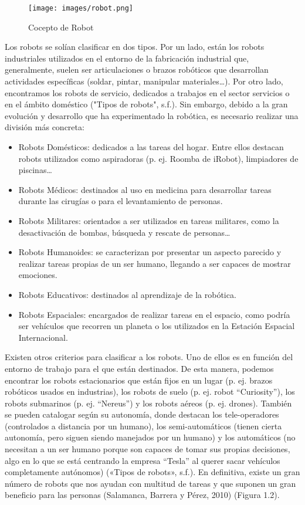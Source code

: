 \documentclass{report}
\begin{document}
\begin{figure}
  \centering
    \texttt{[image: images/robot.png]}
  \caption{Cocepto de Robot}
  \label{Cocepto de Robot}
\end{figure}

Los robots se solían clasificar en dos tipos. Por un lado, están los robots industriales utilizados en el entorno de la fabricación industrial que, generalmente, suelen ser articulaciones o brazos robóticos que desarrollan actividades específicas (soldar, pintar, manipular materiales…). Por otro lado, encontramos los robots de servicio, dedicados a trabajos en el sector servicios o en el ámbito doméstico ("Tipos de robots", s.f.). Sin embargo, debido a la gran evolución y desarrollo que ha experimentado la robótica, es necesario realizar una división más concreta:
\begin{itemize}
	\item Robots Domésticos: dedicados a las tareas del hogar. Entre ellos destacan robots utilizados como aspiradoras (p. ej. Roomba de iRobot), limpiadores de piscinas…

	\item Robots Médicos: destinados al uso en medicina para desarrollar tareas durante las cirugías o para el levantamiento de personas.
		
	\item Robots Militares: orientados a ser utilizados en tareas militares, como la desactivación de bombas, búsqueda y rescate de personas…
	
	\item Robots Humanoides: se caracterizan por presentar un aspecto parecido y realizar tareas propias de un ser humano, llegando a ser capaces de mostrar emociones.
	
	\item Robots Educativos: destinados al aprendizaje de la robótica.
	
	\item Robots Espaciales: encargados de realizar tareas en el espacio, como podría ser vehículos que recorren un planeta o los utilizados en la Estación Espacial Internacional.
\end{itemize}
Existen otros criterios para clasificar a los robots. Uno de ellos es en función del entorno de trabajo para el que están destinados. De esta manera, podemos encontrar los robots estacionarios que están fijos en un lugar (p. ej. brazos robóticos usados en industrias), los robots de suelo (p. ej. robot “Curiosity”), los robots submarinos (p. ej. “Nereus”) y los robots aéreos (p. ej. drones). También se pueden catalogar según su autonomía, donde destacan los tele-operadores (controlados a distancia por un humano), los semi-automáticos (tienen cierta autonomía, pero siguen siendo manejados por un humano) y los automáticos (no necesitan a un ser humano porque son capaces de tomar sus propias decisiones, algo en lo que se está centrando la empresa “Tesla” al querer sacar vehículos completamente autónomos) («Tipos de robots», s.f.). En definitiva, existe un gran número de robots que nos ayudan con multitud de tareas y que suponen un gran beneficio para las personas (Salamanca, Barrera y Pérez, 2010) (Figura 1.2).
\end{document}

